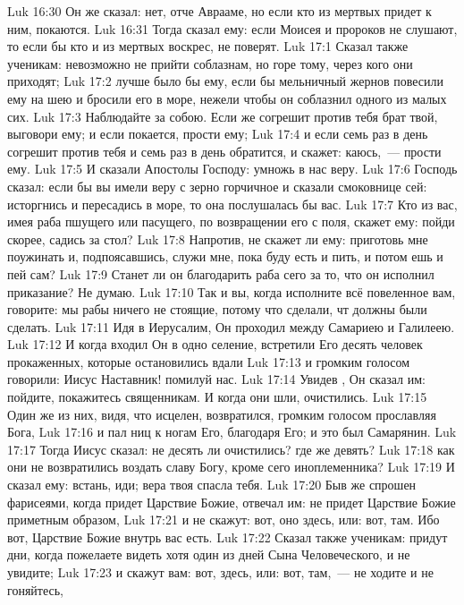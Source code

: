 \vs Luk 16:30 Он же сказал: нет, отче Аврааме, но если кто из мертвых придет к ним, покаются.
\vs Luk 16:31 Тогда  сказал ему: если Моисея и пророков не слушают, то если бы кто и из мертвых воскрес, не поверят.
\vs Luk 17:1 Сказал также  ученикам: невозможно не прийти соблазнам, но горе тому, через кого они приходят;
\vs Luk 17:2 лучше было бы ему, если бы мельничный жернов повесили ему на шею и бросили его в море, нежели чтобы он соблазнил одного из малых сих.
\vs Luk 17:3 Наблюдайте за собою. Если же согрешит против тебя брат твой, выговори ему; и если покается, прости ему;
\vs Luk 17:4 и если семь раз в день согрешит против тебя и семь раз в день обратится, и скажет: каюсь,~--- прости ему.
\rsbpar\vs Luk 17:5 И сказали Апостолы Господу: умножь в нас веру.
\vs Luk 17:6 Господь сказал: если бы вы имели веру с зерно горчичное и сказали смоковнице сей: исторгнись и пересадись в море, то она послушалась бы вас.
\vs Luk 17:7 Кто из вас, имея раба пшущего или пасущего, по возвращении его с поля, скажет ему: пойди скорее, садись за стол?
\vs Luk 17:8 Напротив, не скажет ли ему: приготовь мне поужинать и, подпоясавшись, служи мне, пока буду есть и пить, и потом ешь и пей сам?
\vs Luk 17:9 Станет ли он благодарить раба сего за то, что он исполнил приказание? Не думаю.
\vs Luk 17:10 Так и вы, когда исполните всё повеленное вам, говорите: мы рабы ничего не стоящие, потому что сделали, чт должны были сделать.
\rsbpar\vs Luk 17:11 Идя в Иерусалим, Он проходил между Самариею и Галилеею.
\vs Luk 17:12 И когда входил Он в одно селение, встретили Его десять человек прокаженных, которые остановились вдали
\vs Luk 17:13 и громким голосом говорили: Иисус Наставник! помилуй нас.
\vs Luk 17:14 Увидев , Он сказал им: пойдите, покажитесь священникам. И когда они шли, очистились.
\vs Luk 17:15 Один же из них, видя, что исцелен, возвратился, громким голосом прославляя Бога,
\vs Luk 17:16 и пал ниц к ногам Его, благодаря Его; и это был Самарянин.
\vs Luk 17:17 Тогда Иисус сказал: не десять ли очистились? где же девять?
\vs Luk 17:18 как они не возвратились воздать славу Богу, кроме сего иноплеменника?
\vs Luk 17:19 И сказал ему: встань, иди; вера твоя спасла тебя.
\rsbpar\vs Luk 17:20 Быв же спрошен фарисеями, когда придет Царствие Божие, отвечал им: не придет Царствие Божие приметным образом,
\vs Luk 17:21 и не скажут: вот, оно здесь, или: вот, там. Ибо вот, Царствие Божие внутрь вас есть.
\vs Luk 17:22 Сказал также ученикам: придут дни, когда пожелаете видеть хотя один из дней Сына Человеческого, и не увидите;
\vs Luk 17:23 и скажут вам: вот, здесь, или: вот, там,~--- не ходите и не гоняйтесь,
